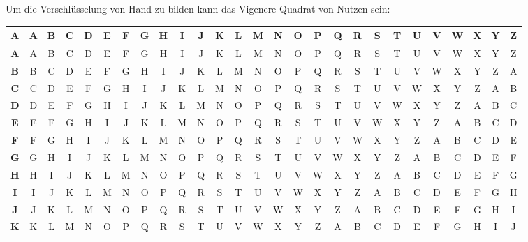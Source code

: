 \documentclass[a4paper, 11pt, accentcolor = tud3b]{tudreport}
\begin{document}
	                    Um die Verschlüsselung von Hand zu bilden kann das Vigenere-Quadrat von Nutzen sein:
	                    \begin{table}[H]
	                    	\centering
	                    	\tiny
	                    	\begin{tabular}{|c||c|c|c|c|c|c|c|c|c|c|c|c|c|c|c|c|c|c|c|c|c|c|c|c|c|c|}
\hline
\textbf{A} & \textbf{A} & \textbf{B} & \textbf{C} & \textbf{D} & \textbf{E} & \textbf{F} & \textbf{G} & \textbf{H} & \textbf{I} & \textbf{J} & \textbf{K} & \textbf{L} & \textbf{M} & \textbf{N} & \textbf{O} & \textbf{P} & \textbf{Q} & \textbf{R} & \textbf{S} & \textbf{T} & \textbf{U} & \textbf{V} & \textbf{W} & \textbf{X} & \textbf{Y} & \textbf{Z} \\ \hline \hline
\textbf{A} & A & B & C & D & E & F & G & H & I & J & K & L & M & N & O & P & Q & R & S & T & U & V & W & X & Y & Z \\ \hline
\textbf{B} & B & C & D & E & F & G & H & I & J & K & L & M & N & O & P & Q & R & S & T & U & V & W & X & Y & Z & A \\ \hline
\textbf{C} & C & D & E & F & G & H & I & J & K & L & M & N & O & P & Q & R & S & T & U & V & W & X & Y & Z & A & B \\ \hline
\textbf{D} & D & E & F & G & H & I & J & K & L & M & N & O & P & Q & R & S & T & U & V & W & X & Y & Z & A & B & C \\ \hline
\textbf{E} & E & F & G & H & I & J & K & L & M & N & O & P & Q & R & S & T & U & V & W & X & Y & Z & A & B & C & D \\ \hline
\textbf{F} & F & G & H & I & J & K & L & M & N & O & P & Q & R & S & T & U & V & W & X & Y & Z & A & B & C & D & E \\ \hline
\textbf{G} & G & H & I & J & K & L & M & N & O & P & Q & R & S & T & U & V & W & X & Y & Z & A & B & C & D & E & F \\ \hline
\textbf{H} & H & I & J & K & L & M & N & O & P & Q & R & S & T & U & V & W & X & Y & Z & A & B & C & D & E & F & G \\ \hline
\textbf{I} & I & J & K & L & M & N & O & P & Q & R & S & T & U & V & W & X & Y & Z & A & B & C & D & E & F & G & H \\ \hline
\textbf{J} & J & K & L & M & N & O & P & Q & R & S & T & U & V & W & X & Y & Z & A & B & C & D & E & F & G & H & I \\ \hline
\textbf{K} & K & L & M & N & O & P & Q & R & S & T & U & V & W & X & Y & Z & A & B & C & D & E & F & G & H & I & J \\ \hline

\end{tabular}
\end{table}
\end{document}
